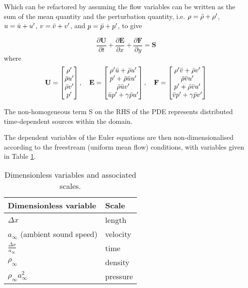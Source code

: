Which can be refactored by assuming the flow variables can be written as the sum of the mean quantity and the perturbation quantity, i.e.  $\rho = \Bar{\rho} + \rho'$, $u = \Bar{u} + u'$, $v = \Bar{v} + v'$, and $p = \Bar{p} + p'$, to give

\begin{equation}
    \frac{\partial \mathbf{U}}{\partial t} + \frac{\partial \mathbf{E}}{\partial x} + \frac{\partial \mathbf{F}}{\partial y} = \mathbf{S}
\end{equation}
where
\begin{displaymath}
\mathbf{U} = 
\begin{bmatrix}
\rho' \\
\Bar{\rho} u' \\
\Bar{\rho} v' \\
p'
\end{bmatrix}, \quad
\mathbf{E} = 
\begin{bmatrix}
\rho' \Bar{u} + \Bar{\rho}u' \\
p' + \Bar{\rho} \Bar{u} u' \\
\Bar{\rho} \Bar{u} v' \\
\Bar{u}p' + \gamma \Bar{p}u'
\end{bmatrix}, \quad
\mathbf{F} = 
\begin{bmatrix}
\rho' \Bar{v} + \Bar{\rho} v' \\
\Bar{\rho}\Bar{v}u'\\
p' + \Bar{\rho} \Bar{v}u'\\
\Bar{v} p' + \gamma \Bar{p} v'
\end{bmatrix}
\end{displaymath}

The non-homogeneous term S on the RHS of the PDE represents distributed time-dependent sources within the domain.

The dependent variables of the Euler equations are then non-dimensionalised according to the freestream (uniform mean flow) conditions, with variables given in Table \ref{tab:DimensionlessVariables}.

\begin{table}[h]
    \centering
    \caption{Dimensionless variables and associated scales.}
    \begin{tabular}{ll}
        \hline \hline
        \textbf{Dimensionless variable} & \textbf{Scale} \\
        \hline
        $\Delta x$ & length \\
        $a_\infty$ (ambient sound speed) & velocity \\
        $\frac{\Delta x}{a_\infty}$ & time \\
        $\rho_\infty$ & density \\
        $\rho_\infty a_\infty^2$ & pressure \\
        \hline \hline
    \end{tabular}
    \label{tab:DimensionlessVariables}
\end{table}

